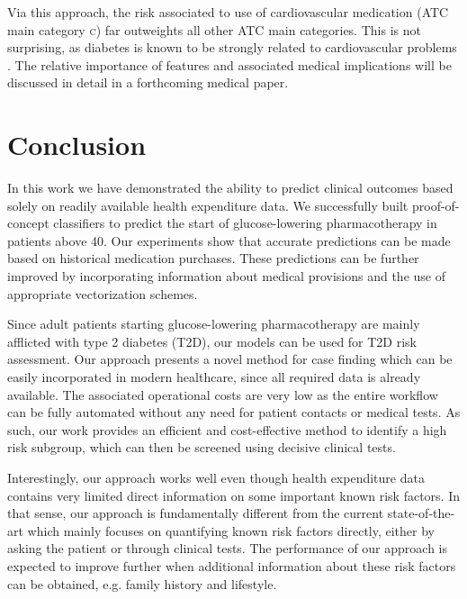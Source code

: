 Via this approach, the risk associated to use of cardiovascular medication (ATC main category \textsc{c}) far outweights all other ATC main categories. This is not surprising, as diabetes is known to be strongly related to cardiovascular problems \citep{doi:10.1001/jama.1979.03290450033020, grundy1999diabetes, hu2002elevated}. The relative importance of features and associated medical implications will be discussed in detail in a forthcoming medical paper.

%
%


\section{Conclusion}
In this work we have demonstrated the ability to predict clinical outcomes based solely on readily available health expenditure data. We successfully built proof-of-concept classifiers to predict the start of glucose-lowering pharmacotherapy in patients above 40. Our experiments show that accurate predictions can be made based on historical medication purchases. These predictions can be further improved by incorporating information about medical provisions and the use of appropriate vectorization schemes.

Since adult patients starting glucose-lowering pharmacotherapy are mainly afflicted with type 2 diabetes (T2D), our models can be used for T2D risk assessment. Our approach presents a novel method for case finding which can be easily incorporated in modern healthcare, since all required data is already available. The associated operational costs are very low as the entire workflow can be fully automated without any need for patient contacts or medical tests. As such, our work provides an efficient and cost-effective method to identify a high risk subgroup, which can then be screened using decisive clinical tests.

Interestingly, our approach works well even though health expenditure data contains very limited direct information on some important known risk factors. In that sense, our approach is fundamentally different from the current state-of-the-art which mainly focuses on quantifying known risk factors directly, either by asking the patient or through clinical tests. The performance of our approach is expected to improve further when additional information about these risk factors can be obtained, e.g. family history and lifestyle.






\cleardoublepage

